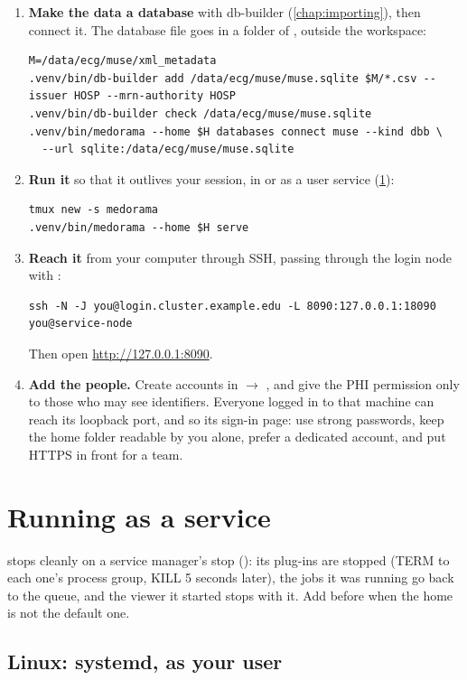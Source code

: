\begin{enumerate}
\item \textbf{Make the data a database} with db-builder (\cref{chap:importing}), then connect it.
  The database file goes in a folder of , outside the workspace:
\begin{lstlisting}[style=shell]
M=/data/ecg/muse/xml_metadata
.venv/bin/db-builder add /data/ecg/muse/muse.sqlite $M/*.csv --issuer HOSP --mrn-authority HOSP
.venv/bin/db-builder check /data/ecg/muse/muse.sqlite
.venv/bin/medorama --home $H databases connect muse --kind dbb \
  --url sqlite:/data/ecg/muse/muse.sqlite
\end{lstlisting}
\item \textbf{Run it} so that it outlives your session, in  or as a user service
  (\cref{sec:deployment-service}):
\begin{lstlisting}[style=shell]
tmux new -s medorama
.venv/bin/medorama --home $H serve
\end{lstlisting}
\item \textbf{Reach it} from your computer through SSH, passing through the login node with
  \opt{-J}:
\begin{lstlisting}[style=shell]
ssh -N -J you@login.cluster.example.edu -L 8090:127.0.0.1:18090 you@service-node
\end{lstlisting}
  Then open \url{http://127.0.0.1:8090}.
\item \textbf{Add the people.} Create accounts in  $\rightarrow$ , and give
  the PHI permission only to those who may see identifiers. Everyone logged in to that machine
  can reach its loopback port, and so its sign-in page: use strong passwords, keep the home
  folder readable by you alone, prefer a dedicated account, and put HTTPS in front for a
  team.
\end{enumerate}

\section{Running as a service}
\label{sec:deployment-service}

 stops cleanly on a service manager's stop (): its plug-ins are
stopped (TERM to each one's process group, KILL 5 seconds later), the jobs it was running go back
to the queue, and the viewer it started stops with it. Add \opt{-{}-home DIR}
before \cmd{serve} when the home is not the default one.

\subsection{Linux: systemd, as your user}
\label{sec:deployment-systemd}

